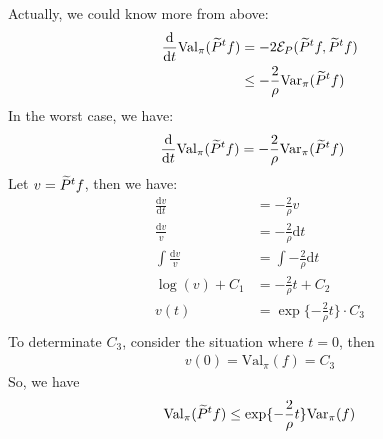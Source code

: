 \documentclass{article}
\begin{document}
Actually, we could know more from above:
\begin{align*}
  \frac{\mathrm{d}}{\mathrm{d}t} \mathrm{Val}_\pi(\widetilde{P}^tf) &= -2\mathcal{E}_P(\widetilde{P}^tf, \widetilde{P}^tf) \\
  &\leq -\frac{2}{\rho} \mathrm{Var}_\pi(\widetilde{P}^tf)
\end{align*}
In the worst case, we have:
\begin{align*}
  \frac{\mathrm{d}}{\mathrm{d}t} \mathrm{Val}_\pi(\widetilde{P}^tf) &= -\frac{2}{\rho} \mathrm{Var}_\pi(\widetilde{P}^tf)
\end{align*}
Let $v = \widetilde{P}^tf$, then we have:
\begin{align*}
  \frac{\mathrm{d}v}{\mathrm{d}t} &= -\frac{2}{\rho}v \\
  \frac{\mathrm{d}v}{v} &= -\frac{2}{\rho}\mathrm{d}t \\
  \int \frac{\mathrm{d}v}{v} &= \int -\frac{2}{\rho}\mathrm{d}t \\
  \log(v) + C_1 &= -\frac{2}{\rho}t + C_2 \\
  v(t) &= \exp\{-\frac{2}{\rho}t\} \cdot C_3 \\
\end{align*}
To determinate $C_3$, consider the situation where $t = 0$, then
\begin{align*}
  v(0) = \mathrm{Val}_\pi(f) = C_3
\end{align*}
So, we have
\begin{align*}
  \mathrm{Val}_\pi(\widetilde{P}^tf) \leq \exp\{-\frac{2}{\rho}t\} \mathrm{Var}_\pi(f)
\end{align*}
\end{document}
